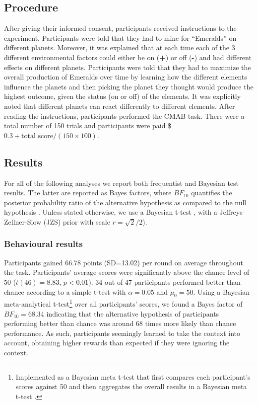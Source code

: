 \documentclass[a4paper,natbib]{apa6}
\begin{document}
\subsection{Procedure}
After giving their informed consent, participants received instructions to the experiment. Participants were told that they had to mine for ``Emeralds'' on different planets. Moreover, it was explained that at each time each of the 3 different environmental factors could either be on (\textbf{+}) or off (\textbf{-}) and had different effects on different planets. Participants were told that they had to maximize the overall production of Emeralds over time by learning how the different elements influence the planets and then picking the planet they thought would produce the highest outcome, given the status (on or off) of the elements. It was explicitly noted that different planets can react differently to different elements. After reading the instructions, participants performed the CMAB task. There were a total number of 150 trials and participants were paid \$$0.3+\text{total score}/(150\times100)$.

\subsection{Results}

For all of the following analyses we report both frequentist and Bayesian test results. The latter are reported as Bayes factors, where $BF_{10}$ quantifies the posterior probability ratio of the alternative hypothesis as compared to the null hypothesis \citep[see][]{morey2015package}. Unless stated otherwise, we use a Bayesian t-test \citep{Rouder2009,Morey2011}, with a Jeffreys-Zellner-Siow (JZS) prior with scale $r = \sqrt{2}/2$).

\subsubsection{Behavioural results}
Participants gained 66.78 points (SD=13.02) per round on average throughout the task. Participants' average scores were significantly above the chance level of 50 ($t(46)=8.83$, $p<0.01$). 34 out of 47 participants performed better than chance according to a simple t-test with $\alpha=0.05$ and $\mu_0=50$. Using a Bayesian meta-analytical t-test\footnote{Implemented as a Bayesian meta t-test that first compares each participant's scores against 50 and then aggregates the overall results in a Bayesian meta t-test \citep[see][]{morey2015package}.} over all participants' scores, we found a Bayes factor of $BF_{10}=68.34$ indicating that the alternative hypothesis of participants performing better than chance was around 68 times more likely than chance performance. As such, participants seemingly learned to take the context into account, obtaining higher rewards than expected if they were ignoring the context. 
\end{document}
